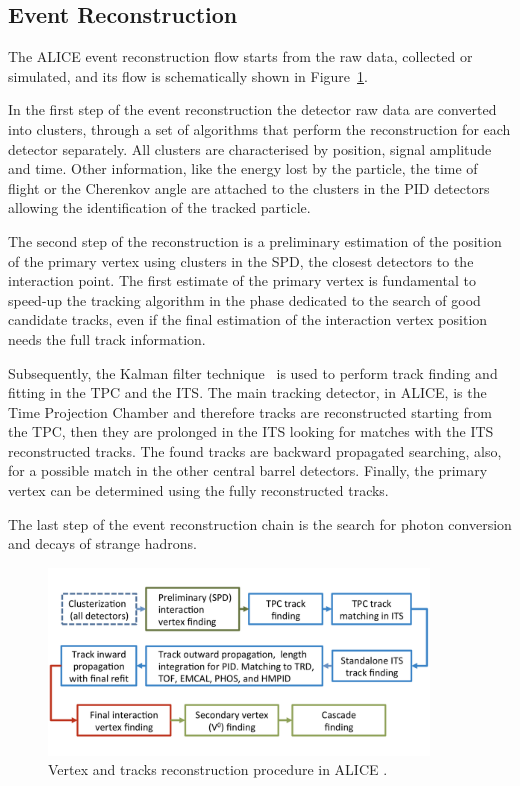 %
\subsection{Event Reconstruction} \label{sec:event_rec}

The ALICE event reconstruction flow starts from the raw data, collected or simulated, and its flow is 
schematically shown in Figure~\ref{fig:rec_flow}. 

In the first step of the event reconstruction the detector raw data are converted into clusters, 
through a set of algorithms that perform the reconstruction for each detector separately.
All clusters are characterised by position, signal amplitude and time.
Other information, like the energy lost by the particle, the time of flight or the Cherenkov 
angle are attached to the clusters in the PID detectors allowing the identification of the 
tracked particle.

The second step of the reconstruction is a preliminary estimation of the position of the primary
vertex using clusters in the SPD, the closest detectors to the interaction point.
The first estimate of the primary vertex is fundamental to speed-up the tracking algorithm in the 
phase dedicated to the search of good candidate tracks, even if the final estimation of the 
interaction vertex position needs the full track information.

Subsequently, the Kalman filter technique~\cite{kalman} is used to perform track finding and
fitting in the TPC and the ITS. 
The main tracking detector, in ALICE, is the Time Projection Chamber and therefore tracks are 
reconstructed  starting from the TPC, then they are prolonged in the ITS looking for matches with
the ITS reconstructed tracks. 
The found tracks are backward propagated searching, also, for a possible match in the other central
barrel detectors.
Finally, the primary vertex can be determined using the fully reconstructed tracks.

The last step of the event reconstruction chain is the search for photon conversion and decays of
strange hadrons.

\begin{figure}
    \captionsetup{justification=centering}
    \centering
    \includegraphics[width=0.9\textwidth]{gfx/reconstruction}
	\caption{Vertex and tracks reconstruction procedure in ALICE \cite{alice:Perf2014}.}
	\label{fig:rec_flow}
\end{figure}

